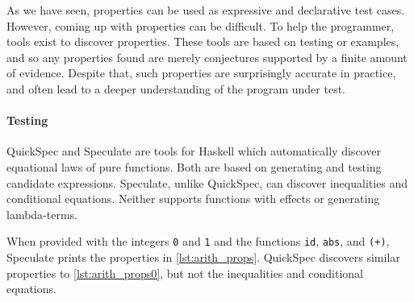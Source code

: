 As we have seen, properties can be used as expressive and declarative
test cases.  However, coming up with properties can be difficult.  To
help the programmer, tools exist to discover properties.  These tools
are based on testing or examples, and so any properties found are
merely conjectures supported by a finite amount of evidence.  Despite
that, such properties are surprisingly accurate in practice, and often
lead to a deeper understanding of the program under test.

\paragraph{Testing}
QuickSpec\cite{claessen2010,smallbone2017} and
Speculate\cite{braquehais2017} are tools for Haskell which
automatically discover equational laws of pure functions.  Both are
based on generating and testing candidate expressions.  Speculate,
unlike QuickSpec, can discover inequalities and conditional equations.
Neither supports functions with effects or generating lambda-terms.

When provided with the integers \verb|0| and \verb|1| and the
functions \verb|id|, \verb|abs|, and \verb|(+)|, Speculate prints the
properties in \cref{lst:arith_props}.  QuickSpec discovers similar
properties to \cref{lst:arith_props0}, but not the inequalities and
conditional equations.


